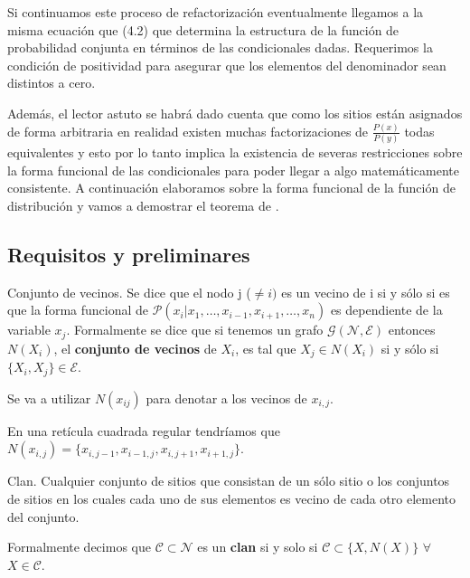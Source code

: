 Si continuamos este proceso de refactorización eventualmente llegamos a la misma ecuación que (4.2) que determina la estructura de la función de probabilidad conjunta en términos de las condicionales dadas. Requerimos la condición de positividad para asegurar que los elementos del denominador sean distintos a cero.

Además, el lector astuto se habrá dado cuenta que como los sitios están asignados de forma arbitraria en realidad existen muchas factorizaciones de $\frac{P(x)}{P(y)}$ todas equivalentes y esto por lo tanto implica la existencia de severas restricciones sobre la forma funcional de las condicionales para poder llegar a algo matemáticamente consistente. A continuación elaboramos sobre la forma funcional de la función de distribución y vamos a demostrar el teorema de \cite{MonteCarloMethods}.




\subsection{Requisitos y preliminares}

\begin{definition}{Conjunto de vecinos.}
Se dice que el nodo j ($\neq i)$ es un vecino de i si y sólo si es que la forma funcional de $\mathcal{P}(x_i|x_1,\ldots,x_{i-1},x_{i+1},\ldots,x_n)$ es dependiente de la variable $x_j$. Formalmente se dice que si tenemos un grafo $\mathcal{G}(\mathcal{N},\mathcal{E})$ entonces  $N(X_i)$, el \textbf{conjunto de vecinos} de $X_i$, es tal que $X_j \in N(X_i)$ si y sólo si $\{X_i, X_j\} \in \mathcal{E}$.

Se va a utilizar $N(x_{ij})$ para denotar a los vecinos de $x_{i,j}$. 
\begin{example}
    En una retícula cuadrada regular tendríamos que
    $N(x_{i,j}) = \{x_{i,j-1},x_{i-1,j},x_{i,j+1},x_{i+1,j}\}$.
\end{example}



\end{definition}

\begin{definition}{Clan.}
    Cualquier conjunto de sitios que consistan de un sólo sitio o los conjuntos de sitios en los cuales cada uno de sus elementos es vecino de cada otro elemento del conjunto.
    
    Formalmente decimos que $\mathcal{C} \subset \mathcal{N}$ es un \textbf{clan} si y solo si $\mathcal{C} \subset \{X,N(X)\}$ $\forall$ $X \in \mathcal{C}$.
\end{definition}

